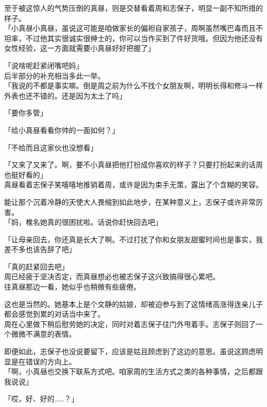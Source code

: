 至于被这惊人的气势压倒的真昼，则是交替看着周和志保子，明显一副不知所措的样子。\\

「小真昼小真昼，虽说这可能是咱做家长的偏袒自家孩子，周啊虽然嘴巴毒而且不坦率，不过他其实很诚实很绅士的，你可以当作买到了件好货哦。但因为他还没有女性经验，这一方面就需要小真昼好好把握了」

「说啥呢赶紧闭嘴吧妈」\\

后半部分的补充相当多此一举。\\

「我说的不都是事实嘛。倒是周之前为什么不找个女朋友啊，明明长得和修斗一样外表也还不错的。还是因为太土了吗」

「要你多管」

「给小真昼看看你帅的一面如何？」

「不给而且这家伙也没想看」

「又来了又来了。啊，要不小真昼把他打扮成你喜欢的样子？只要打扮起来的话周也挺好看的」\\

真昼看着志保子笑嘻嘻地推销着周，或许是因为束手无策，露出了个含糊的笑容。

能让那个沉着冷静的天使大人畏缩到如此地步，在某种意义上，志保子或许非常厉害。\\

「妈，椎名她真的很困扰啦。话说你赶快回去吧」

「让母亲回去，你还真是长大了啊。不过打扰了你和女朋友甜蜜时间也是事实，我差不多也该告辞了吧」

「真的赶紧回去吧」\\

周已经疲于坚决否定，而真昼想必也被志保子这兴致搞得很心累吧。\\

往真昼那边一看，她似乎也稍微有些疲倦。

这也是当然的。她基本上是个文静的姑娘，却被迫参与到了这情绪高涨得连亲儿子都会感觉到累的对话当中来了。\\

周在心里做下稍后慰劳她的决定，同时对着志保子往门外甩着手。志保子则回了一个微微不满意的表情。

即便如此，志保子也没说要留下，应该是姑且顾虑到了这边的意思。虽说这顾虑明显是在错误的方向上。\\

「啊，小真昼也交换下联系方式吧。咱家周的生活方式之类的各种事情，之后都跟我说说」

「哎，好、好的……？」\\

